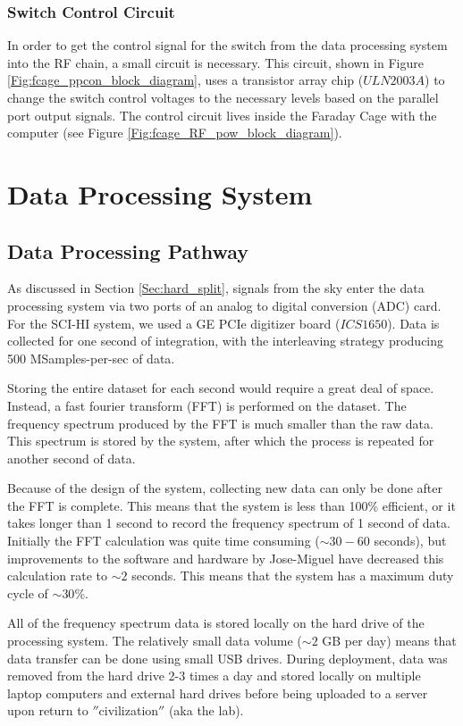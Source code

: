 \subsubsection{Switch Control Circuit}
In order to get the control signal for the switch from the data processing system into the RF chain, a small circuit is necessary. This circuit, shown in Figure \ref{Fig:fcage_ppcon_block_diagram}, uses a transistor array chip ($ULN2003A$) to change the switch control voltages to the necessary levels based on the parallel port output signals. The control circuit lives inside the Faraday Cage with the computer (see Figure \ref{Fig:fcage_RF_pow_block_diagram}). 

\section{Data Processing System}

\subsection{Data Processing Pathway}
As discussed in Section \ref{Sec:hard_split}, signals from the sky enter the data processing system via two ports of an analog to digital conversion (ADC) card. For the SCI-HI system, we used a GE PCIe digitizer board ($ICS1650$). Data is collected for one second of integration, with the interleaving strategy producing 500 MSamples-per-sec of data. 

Storing the entire dataset for each second would require a great deal of space. Instead, a fast fourier transform (FFT) is performed on the dataset. The frequency spectrum produced by the FFT is much smaller than the raw data. This spectrum is stored by the system, after which the process is repeated for another second of data. 

Because of the design of the system, collecting new data can only be done after the FFT is complete. This means that the system is less than 100\% efficient, or it takes longer than 1 second to record the frequency spectrum of 1 second of data. Initially the FFT calculation was quite time consuming ($\sim 30-60$ seconds), but improvements to the software and hardware by Jose-Miguel have decreased this calculation rate to $\sim 2$ seconds. This means that the system has a maximum duty cycle of $\sim30$\%. 

All of the frequency spectrum data is stored locally on the hard drive of the processing system. The relatively small data volume ($\sim 2$ GB per day) means that data transfer can be done using small USB drives. During deployment, data was removed from the hard drive 2-3 times a day and stored locally on multiple laptop computers and external hard drives before being uploaded to a server upon return to $''$civilization$''$ (aka the lab). 

